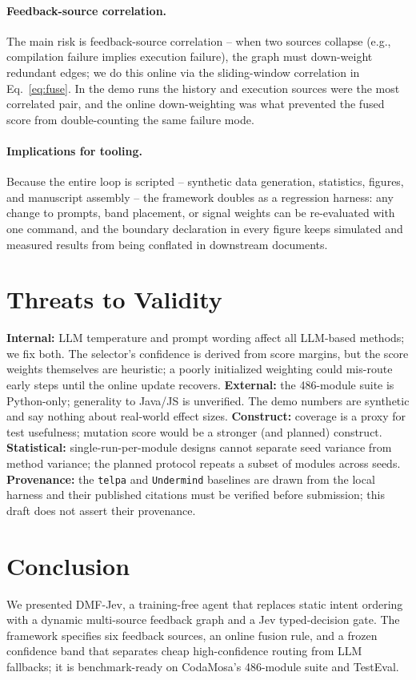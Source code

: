 \documentclass[11pt]{article}
\begin{document}
\paragraph{Feedback-source correlation.}
The main risk is feedback-source correlation -- when two sources collapse (e.g., compilation failure implies execution failure), the graph must down-weight redundant edges; we do this online via the sliding-window correlation in Eq.~\eqref{eq:fuse}. In the demo runs the history and execution sources were the most correlated pair, and the online down-weighting was what prevented the fused score from double-counting the same failure mode.

\paragraph{Implications for tooling.}
Because the entire loop is scripted -- synthetic data generation, statistics, figures, and manuscript assembly -- the framework doubles as a regression harness: any change to prompts, band placement, or signal weights can be re-evaluated with one command, and the boundary declaration in every figure keeps simulated and measured results from being conflated in downstream documents.

\section{Threats to Validity}
\label{sec:threats}
\textbf{Internal:} LLM temperature and prompt wording affect all LLM-based methods; we fix both. The selector's confidence is derived from score margins, but the score weights themselves are heuristic; a poorly initialized weighting could mis-route early steps until the online update recovers.
\textbf{External:} the 486-module suite is Python-only; generality to Java/JS is unverified. The demo numbers are synthetic and say nothing about real-world effect sizes.
\textbf{Construct:} coverage is a proxy for test usefulness; mutation score would be a stronger (and planned) construct.
\textbf{Statistical:} single-run-per-module designs cannot separate seed variance from method variance; the planned protocol repeats a subset of modules across seeds.
\textbf{Provenance:} the \texttt{telpa} and \texttt{Undermind} baselines are drawn from the local harness and their published citations must be verified before submission; this draft does not assert their provenance.

\section{Conclusion}
We presented DMF-Jev, a training-free agent that replaces static intent ordering with a dynamic multi-source feedback graph and a Jev typed-decision gate. The framework specifies six feedback sources, an online fusion rule, and a frozen confidence band that separates cheap high-confidence routing from LLM fallbacks; it is benchmark-ready on CodaMosa's 486-module suite and TestEval.
\end{document}
